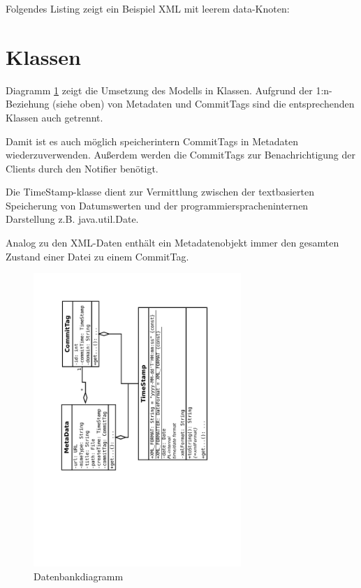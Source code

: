 Folgendes Listing zeigt ein Beispiel XML mit leerem data-Knoten:


\section{Klassen}
Diagramm \ref{design:dia:data:db} zeigt die Umsetzung des Modells in Klassen.
Aufgrund der 1:n-Beziehung (siehe oben) von Metadaten und CommitTags sind die entsprechenden
Klassen auch getrennt. 

Damit ist es auch möglich speicherintern CommitTags in Metadaten wiederzuverwenden.
Außerdem werden die CommitTags zur Benachrichtigung der Clients durch den Notifier benötigt.


Die TimeStamp-klasse dient zur Vermittlung zwischen der textbasierten Speicherung von Datumswerten und der
programmierspracheninternen Darstellung z.B. java.util.Date.

Analog zu den XML-Daten enthält ein Metadatenobjekt immer den gesamten Zustand einer Datei zu einem CommitTag.

\begin{figure}[h]
	\centering
	\label{design:dia:data:db}
	\includegraphics[width=0.7\textwidth, angle=270]{design/data/model.pdf}
	\caption{Datenbankdiagramm}
\end{figure}

